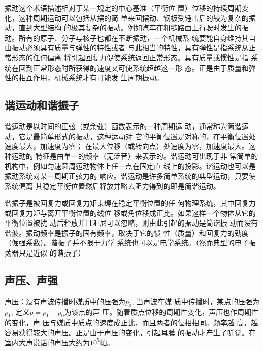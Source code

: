 振动这个术语描述相对于某一规定的中心基准（平衡位
置）位移的持续周期变化，这种周期运动可以包括从摆的简
单来回摆动、钢板受锤击后的较为复杂的振动，直到大型结构
的极其复杂的振动。例如汽车在粗糙路面上行驶时发生的振
动。所有的原子、分子与核子也都在不断振动，一个机械系
统要能自身维持其自由振动必须具有质量与弹性的特性或者
与此相当的特性，具有弹性是指系统从正常形态的任何偏离
将引起回复力促使系统返回正常形态。具有质量或惯性是指
系统在回到正常形态时所获得的速度又可使系统超越这一形
态。正是由于质量和弹性的相互作用，机械系统才有可能发
生周期振动。

\subsection{谐运动和谐振子}
谐运动是以时间的正弦（或余弦）函数表示的一种周期运
动，通常称为简谐运动，它是最简单形式的振动，这种运动对
它的平衡位置是对称的，在平衡位置处速度最大，加速度为零；
在最大位移（或转向点）处速度为零，加速度最大。这种运动的
特征是由单一的频率（无泛音）来表示的。谐运动可出现于非
常简单的机构中，例如匀速圆周运动物体上任一点在固定直
线上的投影。谐运动也可以是振动系统对某一周期正弦力的
响应。谐运动是许多简单系统的典型运动，只要使系统偏离
其稳定平衡位置然后释放并略去阻力得到的即是简谐运动。

谐振子是被回复力或回复力矩束缚在稳定平衡位置的任
何物理系统，其中回复力或回复力矩与离开平衡位置的线位
移或角位移成正比。如果这样一个物体从它的平衡位置被扰
动后释放并且阻尼可以忽略，则由此引起的振动是简谐振
动而没有谐波。振动频率是振子的固有频率，取决于它的惯
性（质量）和回复力的劲度（倔强系数）。谐振子并不限于力学
系统也可以是电学系统。（然而典型的电子振荡器只是近似
的谐振子）

\subsection{声压、声强}
声压：没有声波传播时媒质中的压强为$p_0$, 当声波在媒
质中传播时，某点的压强为$p_1$, 定义$p=p_1-p_0$为该点的声
压。随着质点位移的周期性变化，声压也作周期性的变化，声
压与媒质中质点的速度成正比，而且两者的位相相同。频率越
高，越容易获得较大的声压。正是由于声压的变化，引起耳膜
的振动才产生了听觉。在室内大声说话的声压大约为$10^5$帕。









